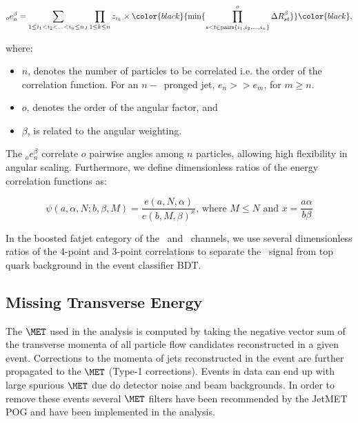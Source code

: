 \begin{equation}
_{o}e_{n}^{\beta} = \sum_{1\leq i_{1}<i_{2}<...<i_{n}\leq n_{J}}{\prod_{1\leq k \leq n}{z_{i_{k}}}} \times \color{black}{\min \{ \prod_{s<t\in \textrm{pairs}\{i_1,i_2,...,i_n\}}^{o} {\Delta R_{st}^{\beta}}\} }\color{black},
\label{eq:ecfs}
\end{equation}

where:

\begin{itemize}
\item $n$, denotes the number of particles to be correlated i.e. the order of the correlation function. For an $n-$~pronged jet, $e_{n} >> e_{m}$, for $m \geq n$.
\item $o$, denotes the order of the angular factor, and
\item $\beta$, is related to the angular weighting.
\end{itemize}

The $_{o}e_{n}^{\beta}$ correlate $o$ pairwise angles among $n$ particles, allowing high flexibility in angular scaling. Furthermore, we define dimensionless ratios of the energy correlation functions as:

\begin{equation}
\psi(a,\alpha,N;b,\beta,M) = \frac{e(a,N,\alpha)}{e(b,M,\beta)^x}\text{, where } M\leq N\text{ and }x=\frac{a\alpha}{b\beta}
\label{eq:psi}
\end{equation}

In the boosted fatjet category of the \WenH\ and \WmnH\ channels, we use several dimensionless ratios of the 4-point and 3-point correlations to separate the \HBB\ signal from 
top quark background in the event classifier BDT.

\subsection{Missing Transverse Energy}

The $\MET$ used in the analysis is computed by taking the negative vector sum of the transverse momenta of all particle flow candidates reconstructed in a given event. Corrections to the momenta of jets reconstructed in the event are further propagated to the $\MET$ (Type-1 corrections).%
Events in data can end up with large spurious $\MET$ due do detector noise and beam backgrounds.
In order to remove these events several $\MET$ filters have been recommended by the JetMET POG and have been implemented in the analysis.

